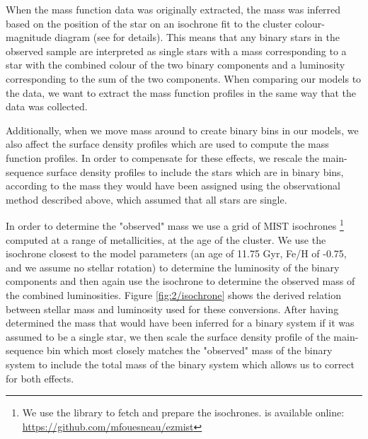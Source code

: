 When the mass function data was originally extracted, the mass was inferred based on the position of
the star on an isochrone fit to the cluster colour-magnitude diagram (see \citealt{Sollima2017} for
details). This means that any binary stars in the observed sample are interpreted as single stars
with a mass corresponding to a star with the combined colour of the two binary components and a
luminosity corresponding to the sum of the two components. When comparing our models to the data, we
want to extract the mass function profiles in the same way that the data was collected.

Additionally, when we move mass around to create binary bins in our models, we also affect the
surface density profiles which are used to compute the mass function profiles. In order to
compensate for these effects, we rescale the main-sequence surface density profiles to include the
stars which are in binary bins, according to the mass they would have been assigned using the
observational method described above, which assumed that all stars are single.

In order to determine the "observed" mass we use a grid of MIST isochrones
\citep{Dotter2016,Choi2016}\footnote{We use the  library to fetch and prepare the
isochrones.  is available online: \url{https://github.com/mfouesneau/ezmist}} computed
at a range of metallicities, at the age of the cluster. We use the isochrone closest to the model
parameters (an age of 11.75 Gyr, Fe/H of -0.75, and we assume no stellar rotation) to determine the
luminosity of the binary components and then again use the isochrone to determine the observed mass
of the combined luminosities. Figure \ref{fig:2/isochrone} shows the derived relation between
stellar mass and luminosity used for these conversions. After having determined the mass that would
have been inferred for a binary system if it was assumed to be a single star, we then scale the
surface density profile of the main-sequence bin which most closely matches the "observed" mass of
the binary system to include the total mass of the binary system which allows us to correct for both
effects.


